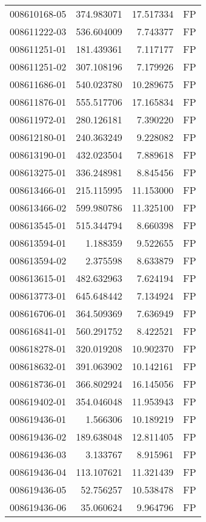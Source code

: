 \begin{tabular}{lrrl}
008610168-05 &  374.983071 &    17.517334 &   FP \\
008611222-03 &  536.604009 &     7.743377 &   FP \\
008611251-01 &  181.439361 &     7.117177 &   FP \\
008611251-02 &  307.108196 &     7.179926 &   FP \\
008611686-01 &  540.023780 &    10.289675 &   FP \\
008611876-01 &  555.517706 &    17.165834 &   FP \\
008611972-01 &  280.126181 &     7.390220 &   FP \\
008612180-01 &  240.363249 &     9.228082 &   FP \\
008613190-01 &  432.023504 &     7.889618 &   FP \\
008613275-01 &  336.248981 &     8.845456 &   FP \\
008613466-01 &  215.115995 &    11.153000 &   FP \\
008613466-02 &  599.980786 &    11.325100 &   FP \\
008613545-01 &  515.344794 &     8.660398 &   FP \\
008613594-01 &    1.188359 &     9.522655 &   FP \\
008613594-02 &    2.375598 &     8.633879 &   FP \\
008613615-01 &  482.632963 &     7.624194 &   FP \\
008613773-01 &  645.648442 &     7.134924 &   FP \\
008616706-01 &  364.509369 &     7.636949 &   FP \\
008616841-01 &  560.291752 &     8.422521 &   FP \\
008618278-01 &  320.019208 &    10.902370 &   FP \\
008618632-01 &  391.063902 &    10.142161 &   FP \\
008618736-01 &  366.802924 &    16.145056 &   FP \\
008619402-01 &  354.046048 &    11.953943 &   FP \\
008619436-01 &    1.566306 &    10.189219 &   FP \\
008619436-02 &  189.638048 &    12.811405 &   FP \\
008619436-03 &    3.133767 &     8.915961 &   FP \\
008619436-04 &  113.107621 &    11.321439 &   FP \\
008619436-05 &   52.756257 &    10.538478 &   FP \\
008619436-06 &   35.060624 &     9.964796 &   FP \\

\end{tabular}
